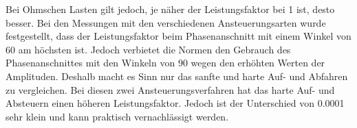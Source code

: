 Bei Ohmschen Lasten gilt jedoch, je näher der Leistungsfaktor bei 1 ist, desto besser. Bei den Messungen mit den verschiedenen Ansteuerungsarten wurde festgestellt, dass der Leistungsfaktor beim Phasenanschnitt mit einem Winkel von 60\textdegree \hspace{0.02cm} am höchsten ist. Jedoch verbietet die Normen den Gebrauch des Phasenanschnittes mit den Winkeln von 90\textdegree \hspace{0.02cm} wegen den erhöhten Werten der Amplituden. Deshalb macht es Sinn nur das sanfte und harte Auf- und Abfahren zu vergleichen. Bei diesen zwei Ansteuerungsverfahren hat das harte Auf- und Absteuern einen höheren Leistungsfaktor. Jedoch ist der Unterschied von 0.0001 sehr klein und kann praktisch vernachlässigt werden.
 



